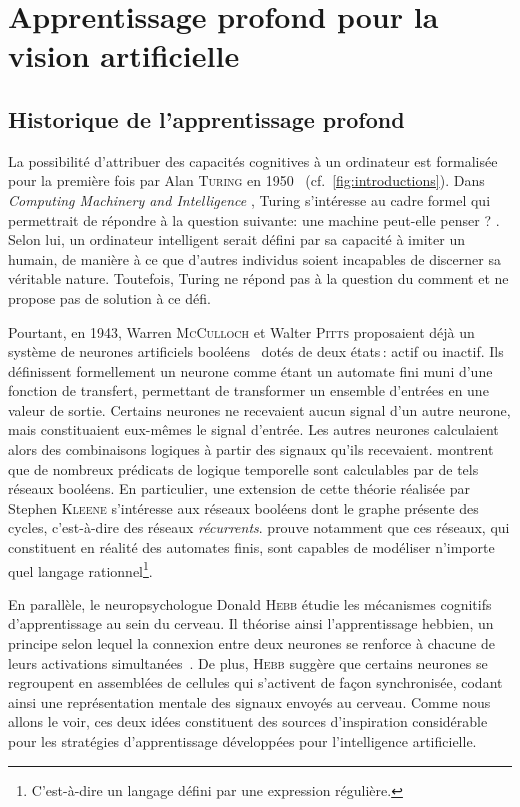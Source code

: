 \section{Apprentissage profond pour la vision artificielle}

\subsection{Historique de l'apprentissage profond}

La possibilité d'attribuer des capacités cognitives à un ordinateur est formalisée pour la première fois par Alan \textsc{Turing} en 1950~\cite{turing_computing_1950} (cf.~\cref{fig:introductions}). Dans \og \emph{Computing Machinery and Intelligence} \fg, Turing s'intéresse au cadre formel qui permettrait de répondre à la question suivante: \og{} une machine peut-elle penser ? \fg{}. Selon lui, un ordinateur intelligent serait défini par sa capacité à imiter un humain, de manière à ce que d'autres individus soient incapables de discerner sa véritable nature. Toutefois, Turing ne répond pas à la question du \og comment \fg{} et ne propose pas de solution à ce défi.

Pourtant, en 1943, Warren \textsc{McCulloch} et Walter \textsc{Pitts} proposaient déjà un système de neurones artificiels booléens~\cite{mcculloch_logical_1943} dotés de deux états\,: actif ou inactif. Ils définissent formellement un neurone comme étant un automate fini muni d'une fonction de transfert, permettant de transformer un ensemble d'entrées en une valeur de sortie. Certains neurones ne recevaient aucun signal d'un autre neurone, mais constituaient eux-mêmes le signal d'entrée. Les autres neurones calculaient alors des combinaisons logiques à partir des signaux qu'ils recevaient. \citet{mcculloch_logical_1943} montrent que de nombreux prédicats de logique temporelle sont calculables par de tels réseaux booléens. En particulier, une extension de cette théorie réalisée par Stephen \textsc{Kleene} s'intéresse aux réseaux booléens dont le graphe présente des cycles, c'est-à-dire des réseaux \emph{récurrents}. \citet{kleene_representation_1956} prouve notamment que ces réseaux, qui constituent en réalité des automates finis, sont capables de modéliser n'importe quel langage rationnel\footnote{C'est-à-dire un langage défini par une expression régulière.}.

En parallèle, le neuropsychologue Donald \textsc{Hebb} étudie les mécanismes cognitifs d'apprentissage au sein du cerveau. Il théorise ainsi l'apprentissage hebbien, un principe selon lequel la connexion entre deux neurones se renforce à chacune de leurs activations simultanées~\cite{hebb_organization_1949}. De plus, \textsc{Hebb} suggère que certains neurones se regroupent en \og{} assemblées de cellules \fg{} qui s'activent de façon synchronisée, codant ainsi une représentation mentale des signaux envoyés au cerveau. Comme nous allons le voir, ces deux idées constituent des sources d'inspiration considérable pour les stratégies d'apprentissage développées pour l'intelligence artificielle.

